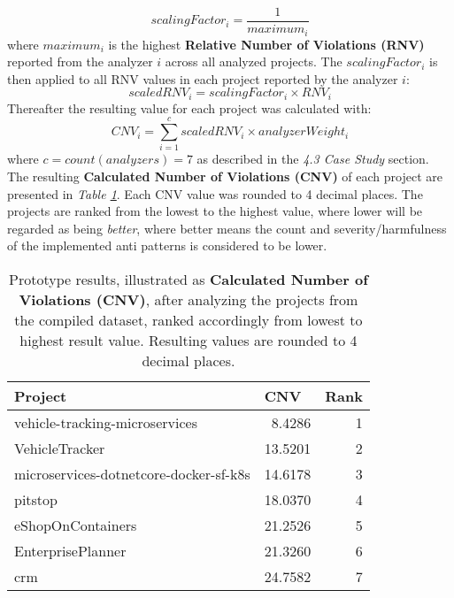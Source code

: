 \documentclass{article}
\begin{document}
\begin{equation}
    scalingFactor_i = \frac{1}{maximum_i}
\end{equation}
where $maximum_i$ is the highest \textbf{Relative Number of Violations (RNV)} reported from the analyzer $i$ across all analyzed projects. The $scalingFactor_i$ is then applied to all RNV values in each project reported by the analyzer $i$: 
\begin{equation}
    scaledRNV_i = scalingFactor_i \times RNV_i
\end{equation}
Thereafter the resulting value for each project was calculated with:
\begin{equation}
    CNV_i = \sum_{i=1}^{c} scaledRNV_i \times analyzerWeight_i
\end{equation}
where $c = count(analyzers) = 7$ as described in the \textit{4.3 Case Study} section. The resulting \textbf{Calculated Number of Violations (CNV)} of each project are presented in \textit{Table \ref{tab:CNVperProject}}. Each CNV value was rounded to 4 decimal places. The projects are ranked from the lowest to the highest value, where lower will be regarded as being \textit{better}, where better means the count and severity/harmfulness of the implemented anti patterns is considered to be lower. \newline

\begin{table}[h!]
\begin{center}
\begin{tabular}{|l|r|r|}
\hline
Project                                & \multicolumn{1}{l|}{CNV} & \multicolumn{1}{l|}{Rank} \\ \hline \hline
vehicle-tracking-microservices         & 8.4286  & 1 \\ \hline
VehicleTracker                         & 13.5201 & 2 \\ \hline
microservices-dotnetcore-docker-sf-k8s & 14.6178 & 3 \\ \hline
pitstop                                & 18.0370 & 4 \\ \hline
eShopOnContainers                      & 21.2526 & 5 \\ \hline
EnterprisePlanner                      & 21.3260 & 6 \\ \hline
crm                                    & 24.7582 & 7 \\ \hline
\end{tabular}
\caption{Prototype results, illustrated as \textbf{Calculated Number of Violations (CNV)}, after analyzing the projects from the compiled dataset, ranked accordingly from lowest to highest result value. Resulting values are rounded to 4 decimal places.}
\label{tab:CNVperProject}
\end{center}
\end{table}
\end{document}
